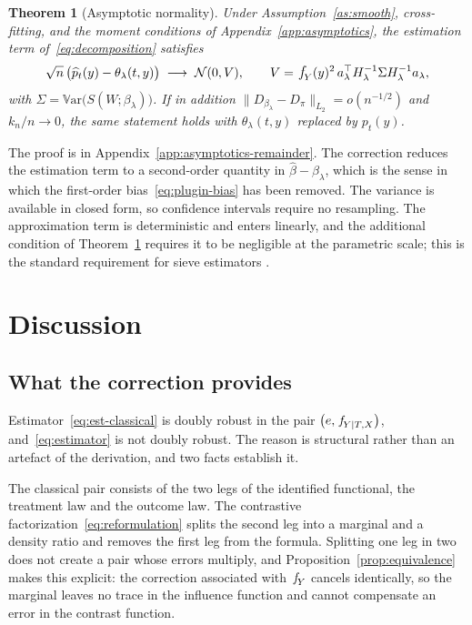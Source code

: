 \documentclass[11pt]{article}
\theoremstyle{plain}
\newtheorem{theorem}{Theorem}
\theoremstyle{definition}
\theoremstyle{remark}
\newcommand{\Var}{\mathbb{V}\text{ar}}
\newcommand{\pf}[1]{\ensuremath{\,\mathlarger{\textit{f}}_{#1}}}
\newcommand{\ratio}{\ensuremath{\pi}}
\newcommand{\contrast}{D_{\ratio}}
\newcommand{\betahat}{\widehat{\beta}}
\newcommand{\ks}{k}
\newcommand{\gps}{e}
\newcommand{\score}{S}
\begin{document}
\begin{theorem}[Asymptotic normality]
\label{thm:asymptotics}
Under Assumption~\ref{as:smooth}, cross-fitting, and the moment conditions of
Appendix~\ref{app:asymptotics}, the estimation term of~\eqref{eq:decomposition} satisfies
\begin{equation}
\sqrt{n}\,\big( \widehat p_t(y) - \theta_\lambda(t,y) \big)
\;\longrightarrow\; \mathcal{N}(0,V),
\qquad
V = \pf{Y}(y)^2\, a_\lambda^\top H_\lambda^{-1} \Sigma H_\lambda^{-1} a_\lambda ,
\label{eq:sandwich}
\end{equation}
with $\Sigma = \Var\big(\score(W;\beta_\lambda)\big)$. If in addition
$\|D_{\beta_\lambda} - \contrast\|_{L_2} = o(n^{-1/2})$ and $\ks_n/n \to 0$, the same
statement holds with $\theta_\lambda(t,y)$ replaced by $p_t(y)$.
\end{theorem}

The proof is in Appendix~\ref{app:asymptotics-remainder}. The correction reduces the
estimation term to a second-order quantity in $\betahat - \beta_\lambda$, which is the
sense in which the first-order bias~\eqref{eq:plugin-bias} has been removed. The variance
is available in closed form, so confidence intervals require no resampling. The
approximation term is deterministic and enters linearly, and the additional condition of
Theorem~\ref{thm:asymptotics} requires it to be negligible at the parametric scale; this
is the standard requirement for sieve estimators
\citep{white1982,chen2007,farrell2021}.

\section{Discussion}
\label{sec:discussion}

\subsection{What the correction provides}
\label{sec:discussion-dr}

Estimator~\eqref{eq:est-classical} is doubly robust in the pair
$\big(\gps, \pf{Y \mid T,X}\big)$, and~\eqref{eq:estimator} is not doubly robust. The
reason is structural rather than an artefact of the derivation, and two facts establish
it.

The classical pair consists of the two legs of the identified functional, the treatment
law and the outcome law. The contrastive factorization~\eqref{eq:reformulation} splits
the second leg into a marginal and a density ratio and removes the first leg from the
formula. Splitting one leg in two does not create a pair whose errors multiply, and
Proposition~\ref{prop:equivalence} makes this explicit: the correction associated with
$\pf{Y}$ cancels identically, so the marginal leaves no trace in the influence function
and cannot compensate an error in the contrast function.
\end{document}
